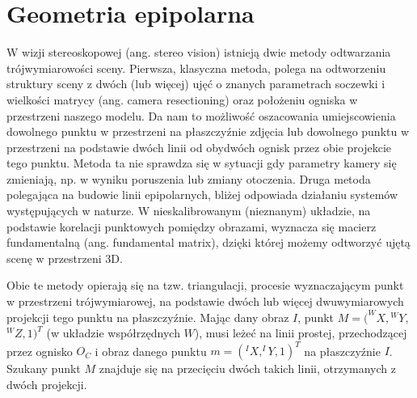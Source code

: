 \chapter{Geometria epipolarna}

W wizji stereoskopowej (ang. stereo vision) istnieją dwie metody odtwarzania
trójwymiarowości sceny. Pierwsza, klasyczna metoda, polega na odtworzeniu
struktury sceny z dwóch (lub więcej) ujęć o znanych parametrach soczewki i
wielkości matrycy (ang. camera resectioning) oraz położeniu ogniska w
przestrzeni naszego modelu. Da nam to możliwość oszacowania umiejscowienia
dowolnego punktu w przestrzeni na płaszczyźnie zdjęcia lub dowolnego punktu w
przestrzeni na podstawie dwóch linii od obydwóch ognisk przez obie projekcie
tego punktu. Metoda ta nie sprawdza się w sytuacji gdy parametry kamery się
zmieniają, np. w wyniku poruszenia lub zmiany otoczenia.  Druga metoda
polegająca na budowie linii epipolarnych, bliżej odpowiada działaniu systemów
występujących w naturze. W nieskalibrowanym (nieznanym) układzie, na podstawie
korelacji punktowych pomiędzy obrazami, wyznacza się macierz fundamentalną
(ang. fundamental matrix), dzięki której możemy odtworzyć ujętą scenę w
przestrzeni 3D. 

Obie te metody opierają się na tzw. triangulacji, procesie wyznaczającym punkt
w przestrzeni trójwymiarowej, na podstawie dwóch lub więcej dwuwymiarowych
projekcji tego punktu na płaszczyźnie. Mając dany obraz $I$, punkt
$M=(^{W}X,$$^{W}Y,$$^{W}Z,$$1)^T$  (w układzie współrzędnych
$W$), musi leżeć na linii prostej, przechodzącej przez ognisko $O_C$ i obraz
danego punktu $m=(^{I}X,^{I}Y,1)^T$ na płaszczyźnie $I$. Szukany punkt $M$
znajduje się na przecięciu dwóch takich linii, otrzymanych z dwóch projekcji. 


